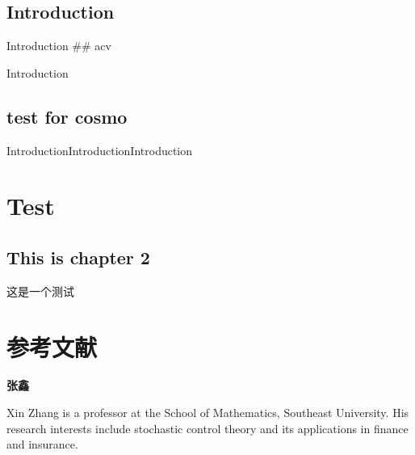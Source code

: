 \documentclass[
  11pt,
  letterpaper,
  onesidefontset=none,
]{ctexbook}
\renewcommand{\headrulewidth}{0pt}
\renewcommand{\footrulewidth}{0pt}
\renewcommand{\headrulewidth}{0pt}%
\renewcommand{\footrulewidth}{0pt}%
\theoremstyle{plain}
\theoremstyle{remark}
\begin{document}
\section{Introduction}\label{introduction-2}

Introduction \#\# acv

Introduction

\section{test for cosmo}\label{test-for-cosmo}

IntroductionIntroductionIntroduction


\chapter{Test}\label{test}

\section{This is chapter 2}\label{this-is-chapter-2}

这是一个测试


\chapter*{参考文献}\label{ux53c2ux8003ux6587ux732e}


\renewcommand{\bibsection}{}


\backmatter
\pagestyle{fancy}
\fancyhf{}
\fancyhead[C]{}
\fancyfoot[C]{\thepage}
\renewcommand{\headrulewidth}{0pt}
\renewcommand{\footrulewidth}{0pt}

\let\stdchaptermark\chaptermark
\renewcommand{\chaptermark}[1]{}
\makeatletter
\let\stdmkboth\@mkboth
\def\@mkboth#1#2{}
\makeatother
\markright{}
\renewcommand\bibname{参考文献}


\vspace*{18pt}
\noindent\textbf{张鑫}\par

Xin Zhang is a professor at the School of Mathematics, Southeast
University. His research interests include stochastic control theory and
its applications in finance and insurance.\par
\end{document}
